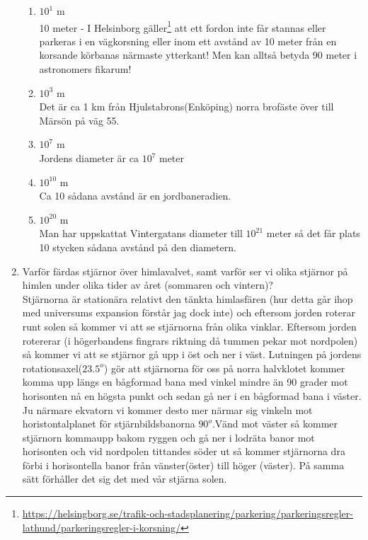 \documentclass[./exercises.tex]{subfiles}
\begin{document}
\begin{enumerate}
\begin{enumerate}[label=(\alph*)]
\item $10^1$ m \\
10 meter - I Helsinborg gäller\footnote{\url{https://helsingborg.se/trafik-och-stadsplanering/parkering/parkeringsregler-lathund/parkeringsregler-i-korsning/}} att
ett fordon inte får stannas eller parkeras i en vägkorsning
eller inom ett avstånd av 10 meter från en korsande körbanas närmaste ytterkant!
Men kan alltså betyda 90 meter i astronomers fikarum!

\item $10^3$ m\\
Det är ca 1 km från Hjulstabrons(Enköping) norra brofäste över till Märsön på väg 55.

\item $10^7$ m\\
Jordens diameter är ca $10^7$ meter

\item $10^{10}$ m\\
Ca 10 sådana avstånd är en jordbaneradien.

\item $10^{20}$ m\\
Man har uppskattat Vintergatans diameter till $10^{21}$ meter så det får plats 10 stycken sådana avstånd
på den diametern.
\end{enumerate}

\item Varför färdas stjärnor över
himlavalvet, samt varför ser vi olika stjärnor på himlen under olika tider av året (sommaren och
vintern)?\\

Stjärnorna är stationära relativt den tänkta himlasfären (hur detta går ihop med universums expansion förstår jag dock inte) och eftersom
jorden roterar runt solen så kommer vi att se stjärnorna från olika vinklar. 
Eftersom jorden rotererar (i högerbandens fingrars riktning då tummen pekar mot nordpolen) så kommer vi att se stjärnor gå
upp i öst och ner i väst. Lutningen på jordens rotationsaxel($23.5^o$) gör att stjärnorna för oss på norra halvklotet kommer komma upp längs en bågformad bana med vinkel mindre
än 90 grader mot horisonten nå en högsta punkt och sedan gå ner i en bågformad bana i väster.
Ju närmare ekvatorn vi kommer desto mer närmar sig vinkeln mot horistontalplanet för stjärnbildsbanorna $90^o$.Vänd mot väster
så kommer stjärnorn kommaupp bakom ryggen och gå ner i lodräta banor mot horisonten och vid nordpolen tittandes söder ut så kommer
stjärnorna dra förbi i horisontella banor från vänster(öster) till höger (väster). På samma sätt förhåller det sig det med vår stjärna
solen.


\end{enumerate}
\end{document}
